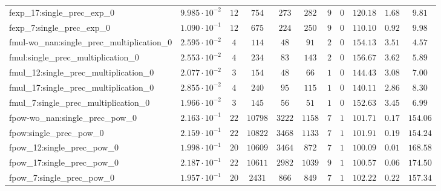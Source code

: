 \begin{tabular}{|l|c|c|c|c|c|c|c|c|c|c|}
fexp\_17:single\_prec\_exp\_0                  & $ 9.985 \cdot 10^{-2} $ & $ 12     $ & $ 754    $ & $ 273   $ & $ 282   $ & $ 9   $ & $ 0 $ & $ 120.18      $ & $ 1.68    $ & $ 9.81    $ \\
fexp\_7:single\_prec\_exp\_0                   & $ 1.090 \cdot 10^{-1} $ & $ 12     $ & $ 675    $ & $ 224   $ & $ 250   $ & $ 9   $ & $ 0 $ & $ 110.10      $ & $ 0.92    $ & $ 9.98    $ \\
fmul-wo\_nan:single\_prec\_multiplication\_0   & $ 2.595 \cdot 10^{-2} $ & $ 4      $ & $ 114    $ & $ 48    $ & $ 91    $ & $ 2   $ & $ 0 $ & $ 154.13      $ & $ 3.51    $ & $ 4.57    $ \\
fmul:single\_prec\_multiplication\_0           & $ 2.553 \cdot 10^{-2} $ & $ 4      $ & $ 234    $ & $ 83    $ & $ 143   $ & $ 2   $ & $ 0 $ & $ 156.67      $ & $ 3.62    $ & $ 5.89    $ \\
fmul\_12:single\_prec\_multiplication\_0       & $ 2.077 \cdot 10^{-2} $ & $ 3      $ & $ 154    $ & $ 48    $ & $ 66    $ & $ 1   $ & $ 0 $ & $ 144.43      $ & $ 3.08    $ & $ 7.00    $ \\
fmul\_17:single\_prec\_multiplication\_0       & $ 2.855 \cdot 10^{-2} $ & $ 4      $ & $ 240    $ & $ 95    $ & $ 115   $ & $ 1   $ & $ 0 $ & $ 140.11      $ & $ 2.86    $ & $ 8.30    $ \\
fmul\_7:single\_prec\_multiplication\_0        & $ 1.966 \cdot 10^{-2} $ & $ 3      $ & $ 145    $ & $ 56    $ & $ 51    $ & $ 1   $ & $ 0 $ & $ 152.63      $ & $ 3.45    $ & $ 6.99    $ \\
fpow-wo\_nan:single\_prec\_pow\_0              & $ 2.163 \cdot 10^{-1} $ & $ 22     $ & $ 10798  $ & $ 3222  $ & $ 1158  $ & $ 7   $ & $ 1 $ & $ 101.71      $ & $ 0.17    $ & $ 154.06  $ \\
fpow:single\_prec\_pow\_0                      & $ 2.159 \cdot 10^{-1} $ & $ 22     $ & $ 10822  $ & $ 3468  $ & $ 1133  $ & $ 7   $ & $ 1 $ & $ 101.91      $ & $ 0.19    $ & $ 154.24  $ \\
fpow\_12:single\_prec\_pow\_0                  & $ 1.998 \cdot 10^{-1} $ & $ 20     $ & $ 10609  $ & $ 3464  $ & $ 872   $ & $ 7   $ & $ 1 $ & $ 100.09      $ & $ 0.01    $ & $ 168.58  $ \\
fpow\_17:single\_prec\_pow\_0                  & $ 2.187 \cdot 10^{-1} $ & $ 22     $ & $ 10611  $ & $ 2982  $ & $ 1039  $ & $ 9   $ & $ 1 $ & $ 100.57      $ & $ 0.06    $ & $ 174.50  $ \\
fpow\_7:single\_prec\_pow\_0                   & $ 1.957 \cdot 10^{-1} $ & $ 20     $ & $ 2431   $ & $ 866   $ & $ 849   $ & $ 7   $ & $ 1 $ & $ 102.22      $ & $ 0.22    $ & $ 157.34  $ \\

\end{tabular}
